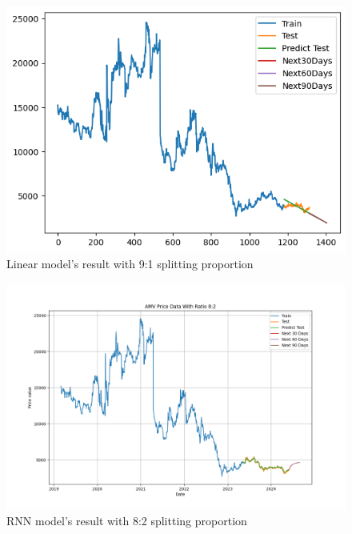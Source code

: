 \documentclass{ieeeojies}
\begin{document}
\begin{figure}[H]
  \centering
  \begin{minipage}{0.8\linewidth}
    \centering
    \includegraphics[width=\linewidth]{bibliography/Figure/AMV_LN_91.png}
    \caption{Linear model's result with 9:1 splitting proportion}
    \label{fig8}
  \end{minipage}
\end{figure}

\begin{figure}[H]
  \centering
  \begin{minipage}{0.8\linewidth}
    \centering
    \includegraphics[width=\linewidth]{bibliography/Figure/RNN_82_AMV.png}
    \caption{RNN model's result with 8:2 splitting proportion}
    \label{fig8}
  \end{minipage}
\end{figure}
\end{document}
